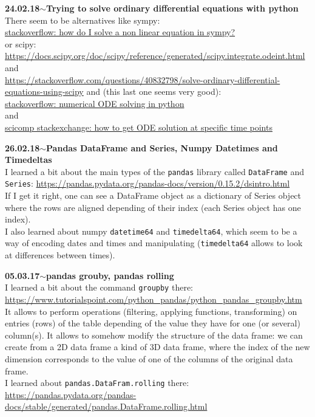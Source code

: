 \documentclass[11pt,a4paper]{article}
\newenvironment{loggentry}[2]%
{\noindent\textbf{#1}\hspace{1cm}$\mathbf{\sim}$\text{ }\textbf{#2}\\}{\vspace{0.5cm}}
\begin{document}
\begin{loggentry}{24.02.18}{Trying to solve ordinary differential equations with python}
There seem to be alternatives like sympy:\\
\href{https://stackoverflow.com/questions/36232863/how-do-i-solve-a-non-linear-equation-in-sympy}{stackoverflow: how do I solve a non linear equation in sympy?}\\
or scipy:\\
\url{https://docs.scipy.org/doc/scipy/reference/generated/scipy.integrate.odeint.html}\\
and\\
\url{https://stackoverflow.com/questions/40832798/solve-ordinary-differential-equations-using-scipy}
and (this last one seems very good):\\
\href{https://stackoverflow.com/questions/15928750/numerical-ode-solving-in-python#15929381}{stackoverflow: numerical ODE solving in python}\\
and\\
\href{https://scicomp.stackexchange.com/questions/11616/how-to-get-ode-solution-at-specified-time-points}{scicomp stackexchange: how to get ODE solution at specific time points}\\
\end{loggentry}

\begin{loggentry}{26.02.18}{Pandas DataFrame and Series, Numpy Datetimes and Timedeltas}
I learned a bit about the main types of the \texttt{pandas} library called \texttt{DataFrame} and \texttt{Series}:
\url{https://pandas.pydata.org/pandas-docs/version/0.15.2/dsintro.html}\\
If I get it right, one can see a DataFrame object as a dictionary of Series object where the rows are aligned depending of their index (each Series object has one index).\\
I also learned about numpy \texttt{datetime64} and \texttt{timedelta64}, which seem to be a way of encoding dates and times and manipulating (\texttt{timedelta64} allows to look at differences between times).
\end{loggentry}

\begin{loggentry}{05.03.17}{pandas grouby, pandas rolling}
I learned a bit about the command \texttt{groupby} there:\\
\url{https://www.tutorialspoint.com/python_pandas/python_pandas_groupby.htm}\\
It allows to perform operations (filtering, applying functions, transforming) on entries (rows) of the table depending of the value they have for one (or several) column(s). It allows to somehow modify the structure of the data frame: we can create from a 2D data frame a kind of 3D data frame, where the index of the new dimension corresponds to the value of one of the columns of the original data frame.\\
I learned about \texttt{pandas.DataFram.rolling} there:\\
\url{https://pandas.pydata.org/pandas-docs/stable/generated/pandas.DataFrame.rolling.html}\\
\end{loggentry}
\end{document}
